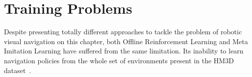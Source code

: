 \section{Training Problems}\label{sec:training-problems}

Despite presenting totally different approaches to tackle the problem of robotic visual navigation on this chapter, both Offline Reinforcement Learning and Meta Imitation Learning have suffered from the same limitation.
Its inability to learn navigation policies from the whole set of environments present in the HM3D dataset~\cite{Ramakrishnan2021HabitatMatterport3D}.
